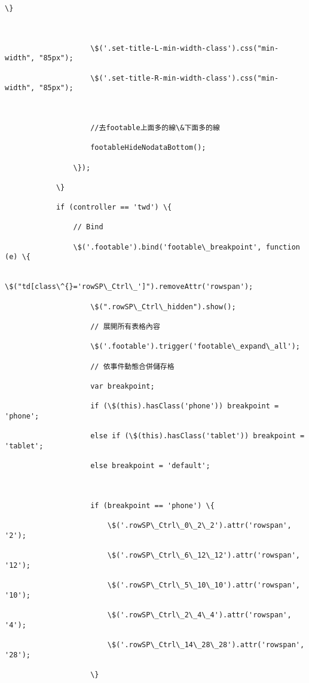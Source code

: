 \documentclass[11pt]{article}
\begin{document}
\begin{Verbatim}[commandchars=\\\{\}]
                    \}



                    \$('.set-title-L-min-width-class').css("min-width", "85px");

                    \$('.set-title-R-min-width-class').css("min-width", "85px");



                    //去footable上面多的線\&下面多的線

                    footableHideNodataBottom();

                \});

            \}

            if (controller == 'twd') \{

                // Bind

                \$('.footable').bind('footable\_breakpoint', function (e) \{

                    \$("td[class\^{}='rowSP\_Ctrl\_']").removeAttr('rowspan');

                    \$(".rowSP\_Ctrl\_hidden").show();

                    // 展開所有表格內容

                    \$('.footable').trigger('footable\_expand\_all');

                    // 依事件動態合併儲存格

                    var breakpoint;

                    if (\$(this).hasClass('phone')) breakpoint = 'phone';

                    else if (\$(this).hasClass('tablet')) breakpoint = 'tablet';

                    else breakpoint = 'default';



                    if (breakpoint == 'phone') \{

                        \$('.rowSP\_Ctrl\_0\_2\_2').attr('rowspan', '2');

                        \$('.rowSP\_Ctrl\_6\_12\_12').attr('rowspan', '12');

                        \$('.rowSP\_Ctrl\_5\_10\_10').attr('rowspan', '10');

                        \$('.rowSP\_Ctrl\_2\_4\_4').attr('rowspan', '4');

                        \$('.rowSP\_Ctrl\_14\_28\_28').attr('rowspan', '28');

                    \}


\end{Verbatim}
\end{document}
